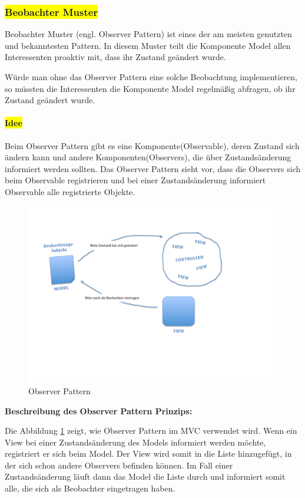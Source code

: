 \subsubsection{\colorbox{yellow}{Beobachter Muster}}\label{observer}

Beobachter Muster (engl. Observer Pattern) ist eines der am meisten genutzten und bekanntesten Pattern. In diesem Muster teilt die Komponente Model allen Interessenten proaktiv mit, dass ihr Zustand geändert wurde.

Würde man ohne das Observer Pattern eine solche Beobachtung implementieren, so müssten die Interessenten die Komponente Model regelmäßig abfragen, ob ihr Zustand geändert wurde.
\paragraph{\colorbox{yellow}{Idee}}
Beim Observer Pattern gibt es eine Komponente(Observable), deren Zustand sich ändern kann und andere Komponenten(Observers), die über Zustandsänderung informiert werden sollten. Das Observer Pattern sieht vor, dass die Observers sich beim Observable registrieren und bei einer Zustandsänderung informiert Observable alle registrierte Objekte.

\begin{figure}[H]
\centering
\includegraphics[trim = 0mm 50mm 20mm 30mm, clip, width=1.0\textwidth]{resources/observer}
\caption[Observer Pattern]{Observer Pattern}
\label{img:observer}
\end{figure}

\textbf{Beschreibung des Observer Pattern Prinzips:}

Die Abbildung \ref{img:observer} zeigt, wie Observer Pattern im MVC verwendet wird. Wenn ein View bei einer Zustandsänderung des Models informiert werden möchte, registriert er sich beim Model. Der View wird somit in die Liste hinzugefügt, in der sich schon andere Observers befinden können. Im Fall einer Zustandsänderung läuft dann das Model die Liste durch und informiert somit alle, die sich als Beobachter eingetragen haben.
